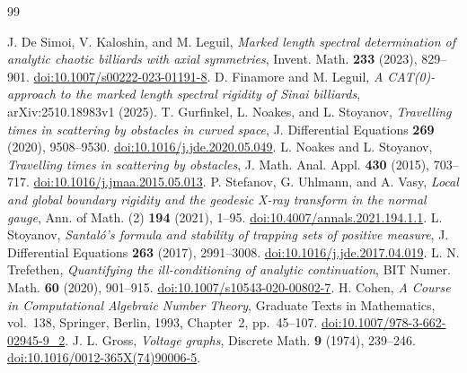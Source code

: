\begin{thebibliography}{99}
\raggedright
{}
J. De Simoi, V. Kaloshin, and M. Leguil,
\emph{Marked length spectral determination of analytic chaotic billiards
with axial symmetries}, Invent. Math. \textbf{233} (2023), 829--901.
\href{https://doi.org/10.1007/s00222-023-01191-8}{doi:10.1007/s00222-023-01191-8}.
D. Finamore and M. Leguil,
\emph{A CAT(0)-approach to the marked length spectral rigidity of Sinai
billiards}, arXiv:2510.18983v1 (2025).
T. Gurfinkel, L. Noakes, and L. Stoyanov,
\emph{Travelling times in scattering by obstacles in curved space},
J. Differential Equations \textbf{269} (2020), 9508--9530.
\href{https://doi.org/10.1016/j.jde.2020.05.049}{doi:10.1016/j.jde.2020.05.049}.
L. Noakes and L. Stoyanov,
\emph{Travelling times in scattering by obstacles},
J. Math. Anal. Appl. \textbf{430} (2015), 703--717.
\href{https://doi.org/10.1016/j.jmaa.2015.05.013}{doi:10.1016/j.jmaa.2015.05.013}.
P. Stefanov, G. Uhlmann, and A. Vasy,
\emph{Local and global boundary rigidity and the geodesic X-ray transform
in the normal gauge}, Ann. of Math. (2) \textbf{194} (2021), 1--95.
\href{https://doi.org/10.4007/annals.2021.194.1.1}{doi:10.4007/annals.2021.194.1.1}.
L. Stoyanov,
\emph{Santal\'o's formula and stability of trapping sets of positive measure},
J. Differential Equations \textbf{263} (2017), 2991--3008.
\href{https://doi.org/10.1016/j.jde.2017.04.019}{doi:10.1016/j.jde.2017.04.019}.
L. N. Trefethen,
\emph{Quantifying the ill-conditioning of analytic continuation},
BIT Numer. Math. \textbf{60} (2020), 901--915.
\href{https://doi.org/10.1007/s10543-020-00802-7}{doi:10.1007/s10543-020-00802-7}.
H. Cohen, \emph{A Course in Computational Algebraic Number Theory},
Graduate Texts in Mathematics, vol.~138, Springer, Berlin, 1993,
Chapter~2, pp.~45--107.
\href{https://doi.org/10.1007/978-3-662-02945-9_2}{doi:10.1007/978-3-662-02945-9\_2}.
J. L. Gross, \emph{Voltage graphs}, Discrete Math. \textbf{9} (1974),
239--246.
\href{https://doi.org/10.1016/0012-365X(74)90006-5}{doi:10.1016/0012-365X(74)90006-5}.
\end{thebibliography}
